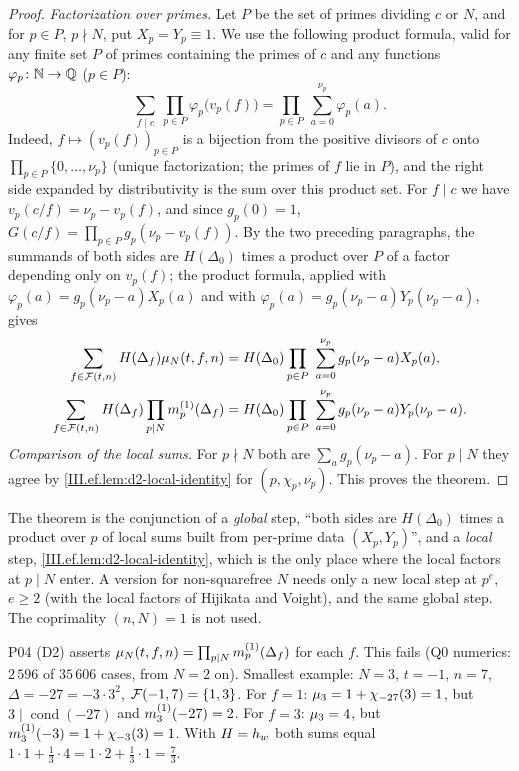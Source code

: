 \begin{proof}
\emph{Factorization over primes.} Let $P$ be the set of primes dividing $c$ or $N$, and for $p\in P$, $p\nmid N$, put $X_p=Y_p\equiv1$. We use the
following product formula, valid for any finite set $P$ of primes containing the primes of $c$ and any functions $\varphi_p\colon\mathbb{N}\to\mathbb{Q}$ ($p\in P$):
\[
  \sum_{f\mid c}\ \prod_{p\in P}\varphi_p\bigl(v_p(f)\bigr)=\prod_{p\in P}\ \sum_{a=0}^{\nu_p}\varphi_p(a).
\]
Indeed, $f\mapsto(v_p(f))_{p\in P}$ is a bijection from the positive divisors of $c$ onto $\prod_{p\in P}\{0,\dots,\nu_p\}$ (unique factorization;
the primes of $f$ lie in $P$), and the right side expanded by distributivity is the sum over this product set. For $f\mid c$ we have
$v_p(c/f)=\nu_p-v_p(f)$, and since $g_p(0)=1$, $G(c/f)=\prod_{p\in P}g_p(\nu_p-v_p(f))$. By the two preceding paragraphs, the summands of both
sides are $H(\Delta_0)$ times a product over $P$ of a factor depending only on $v_p(f)$; the product formula, applied with
$\varphi_p(a)=g_p(\nu_p-a)X_p(a)$ and with $\varphi_p(a)=g_p(\nu_p-a)Y_p(\nu_p-a)$, gives
\[
\begin{aligned}
  \sum_{f\in\Ford(t,n)}H(\Delta_f)\embmu_N(t,f,n)&=H(\Delta_0)\prod_{p\in P}\ \sum_{a=0}^{\nu_p}g_p(\nu_p-a)X_p(a),\\
  \sum_{f\in\Ford(t,n)}H(\Delta_f)\prod_{p\mid N}\mone_p(\Delta_f)&=H(\Delta_0)\prod_{p\in P}\ \sum_{a=0}^{\nu_p}g_p(\nu_p-a)Y_p(\nu_p-a).
\end{aligned}
\]
\emph{Comparison of the local sums.} For $p\nmid N$ both are $\sum_ag_p(\nu_p-a)$. For $p\mid N$ they agree by \cref{III.ef.lem:d2-local-identity}
for $(p,\chi_p,\nu_p)$. This proves the theorem.
\end{proof}
\begin{remark}
The theorem is the conjunction of a \emph{global} step, ``both sides are $H(\Delta_0)$ times a product over $p$ of local sums built from per-prime
data $(X_p,Y_p)$'', and a \emph{local} step, \cref{III.ef.lem:d2-local-identity}, which is the only place where the local factors at $p\mid N$ enter. A
version for non-squarefree $N$ needs only a new local step at $p^e$, $e\ge2$ (with the local factors of Hijikata and Voight), and the same global
step. The coprimality $(n,N)=1$ is not used.
\end{remark}
\begin{remark}\label{rem:ef-termwise-false}
P04 (D2) asserts $\mu_N(t,f,n)=\prod_{p\mid N}m^{(1)}_p(\Delta_f)$ for each $f$. This fails (Q0 numerics: $2\,596$ of $35\,606$ cases, from $N=2$ on).
Smallest example: $N=3$, $t=-1$, $n=7$, $\Delta=-27=-3\cdot3^2$, $\mathcal{F}(-1,7)=\{1,3\}$. For $f=1$: $\mu_3=1+\chi_{-27}(3)=1$, but $3\mid\operatorname{cond}(-27)$
and $m^{(1)}_3(-27)=2$. For $f=3$: $\mu_3=4$, but $m^{(1)}_3(-3)=1+\chi_{-3}(3)=1$. With $H=h_w$ both sums equal $1\cdot1+\frac13\cdot4=1\cdot2+\frac13\cdot1=\frac73$.
\end{remark}

